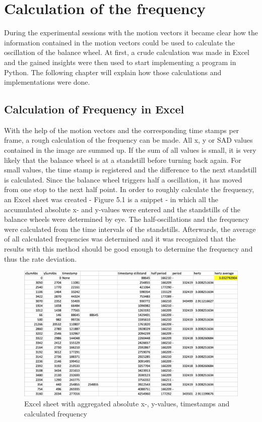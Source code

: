 \documentclass[12pt, a4paper]{report}
\begin{document}
    \chapter{Calculation of the frequency}
During the experimental sessions with the motion vectors it became clear how the information contained in the motion vectors could be used to calculate the oscillation of the balance wheel. At first, a crude calculation was made in Excel and the gained insights were then used to start implementing a program in Python. The following chapter will explain how those calculations and implementations were done.
    
     \section{Calculation of Frequency in Excel}
    With the help of the motion vectors and the corresponding time stamps per frame, a rough calculation of the frequency can be made. All x, y or SAD values contained in the image are summed up. If the sum of all values is small, it is very likely that the balance wheel is at a standstill before turning back again. For small values, the time stamp is registered and the difference to the next standstill is calculated. Since the balance wheel triggers half a oscillation, it has moved from one stop to the next half point. 
    In order to roughly calculate the frequency, an Excel sheet was created - Figure 5.1 is a snippet - in which all the accumulated absolute x- and y-values were entered and the standstills of the balance wheels were determined by eye. The half-oscillations and the frequency were calculated from the time intervals of the standstills. Afterwards, the average of all calculated frequencies was determined and it was recognized that the results with this method should be good enough to determine the frequency and thus the rate deviation. 
    
    \noindent
    \begin{figure}[H]
    \centering
    \includegraphics[scale=0.45]{Images/excel_sheet_numbers.png}
    
    \caption{Excel sheet with aggregated absolute x-, y-values, timestamps and calculated frequency}
    \end{figure}
    
\end{document}

